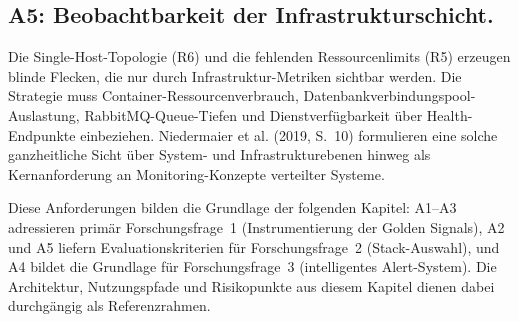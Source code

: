 \subsection{A5: Beobachtbarkeit der Infrastrukturschicht.}
Die Single-Host-Topologie (R6) und die fehlenden Ressourcenlimits (R5) erzeugen blinde Flecken, die nur durch Infrastruktur-Metriken sichtbar werden. Die Strategie muss Container-Ressourcenverbrauch, Datenbankverbindungspool-Auslastung, RabbitMQ-Queue-Tiefen und Dienstverfügbarkeit über Health-Endpunkte einbeziehen. Niedermaier et al. (2019, S.~10) formulieren eine solche ganzheitliche Sicht über System- und Infrastrukturebenen hinweg als Kernanforderung an Monitoring-Konzepte verteilter Systeme.
 
\bigskip
 
Diese Anforderungen bilden die Grundlage der folgenden Kapitel: A1--A3 adressieren primär Forschungsfrage~1 (Instrumentierung der Golden Signals), A2 und A5 liefern Evaluationskriterien für Forschungsfrage~2 (Stack-Auswahl), und A4 bildet die Grundlage für Forschungsfrage~3 (intelligentes Alert-System). Die Architektur, Nutzungspfade und Risikopunkte aus diesem Kapitel dienen dabei durchgängig als Referenzrahmen.